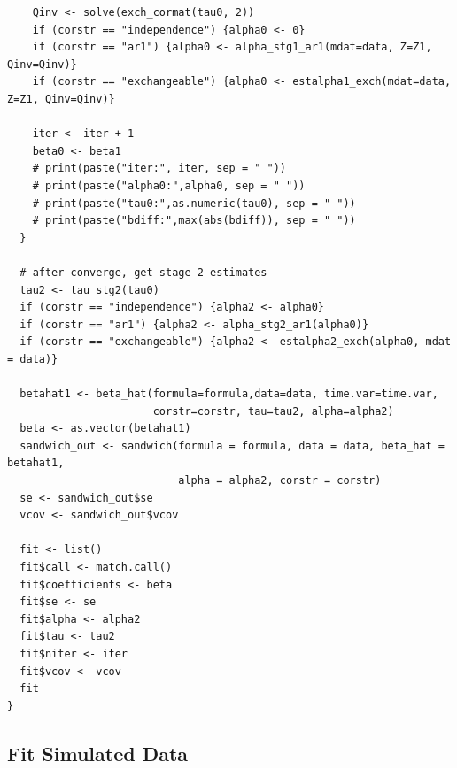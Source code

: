 \documentclass[
]{aft}
\begin{document}
\begin{verbatim}
    Qinv <- solve(exch_cormat(tau0, 2))
    if (corstr == "independence") {alpha0 <- 0}
    if (corstr == "ar1") {alpha0 <- alpha_stg1_ar1(mdat=data, Z=Z1, Qinv=Qinv)}
    if (corstr == "exchangeable") {alpha0 <- estalpha1_exch(mdat=data, Z=Z1, Qinv=Qinv)}
    
    iter <- iter + 1
    beta0 <- beta1
    # print(paste("iter:", iter, sep = " "))
    # print(paste("alpha0:",alpha0, sep = " "))
    # print(paste("tau0:",as.numeric(tau0), sep = " "))
    # print(paste("bdiff:",max(abs(bdiff)), sep = " "))
  }
  
  # after converge, get stage 2 estimates
  tau2 <- tau_stg2(tau0)
  if (corstr == "independence") {alpha2 <- alpha0}
  if (corstr == "ar1") {alpha2 <- alpha_stg2_ar1(alpha0)}
  if (corstr == "exchangeable") {alpha2 <- estalpha2_exch(alpha0, mdat = data)}
  
  betahat1 <- beta_hat(formula=formula,data=data, time.var=time.var, 
                       corstr=corstr, tau=tau2, alpha=alpha2)
  beta <- as.vector(betahat1)
  sandwich_out <- sandwich(formula = formula, data = data, beta_hat = betahat1, 
                           alpha = alpha2, corstr = corstr)
  se <- sandwich_out$se
  vcov <- sandwich_out$vcov
  
  fit <- list()
  fit$call <- match.call()
  fit$coefficients <- beta
  fit$se <- se
  fit$alpha <- alpha2
  fit$tau <- tau2
  fit$niter <- iter
  fit$vcov <- vcov
  fit
}
\end{verbatim}

\newpage

\subsection{Fit Simulated Data}\label{fit-simulated-data}
\end{document}
